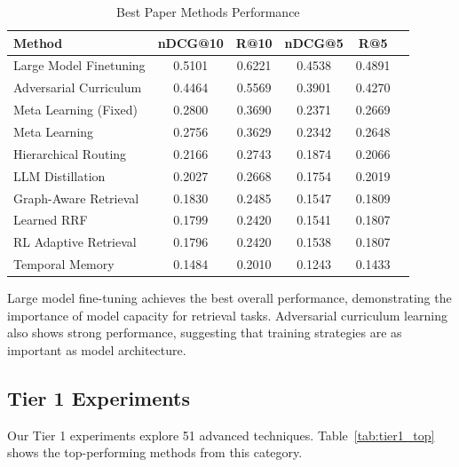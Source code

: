 \documentclass[11pt]{article}
\begin{document}
\begin{table}[h]
\centering
\caption{Best Paper Methods Performance}
\label{tab:best_paper}
\small
\begin{tabular}{lccccc}
\toprule
\textbf{Method} & \textbf{nDCG@10} & \textbf{R@10} & \textbf{nDCG@5} & \textbf{R@5} \\
\midrule
Large Model Finetuning & 0.5101 & 0.6221 & 0.4538 & 0.4891 \\
Adversarial Curriculum & 0.4464 & 0.5569 & 0.3901 & 0.4270 \\
Meta Learning (Fixed) & 0.2800 & 0.3690 & 0.2371 & 0.2669 \\
Meta Learning & 0.2756 & 0.3629 & 0.2342 & 0.2648 \\
Hierarchical Routing & 0.2166 & 0.2743 & 0.1874 & 0.2066 \\
LLM Distillation & 0.2027 & 0.2668 & 0.1754 & 0.2019 \\
Graph-Aware Retrieval & 0.1830 & 0.2485 & 0.1547 & 0.1809 \\
Learned RRF & 0.1799 & 0.2420 & 0.1541 & 0.1807 \\
RL Adaptive Retrieval & 0.1796 & 0.2420 & 0.1538 & 0.1807 \\
Temporal Memory & 0.1484 & 0.2010 & 0.1243 & 0.1433 \\
\bottomrule
\end{tabular}
\end{table}

Large model fine-tuning achieves the best overall performance, demonstrating the importance of model capacity for retrieval tasks. Adversarial curriculum learning also shows strong performance, suggesting that training strategies are as important as model architecture.

\subsection{Tier 1 Experiments}

Our Tier 1 experiments explore 51 advanced techniques. Table~\ref{tab:tier1_top} shows the top-performing methods from this category.
\end{document}
